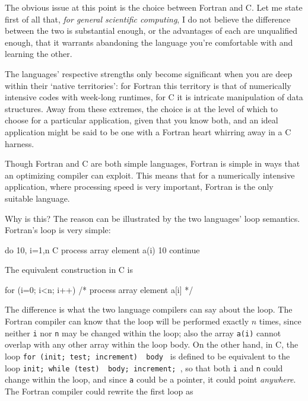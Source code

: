 \documentclass[11pt,oneside,chapters]{starlink}
\begin{document}
The obvious issue at this point is the choice between
Fortran and C.  Let me state first of all that, \emph{for
general scientific computing}, I do not believe the
difference between the two is substantial enough, or the
advantages of each are unqualified enough, that it warrants
abandoning the language you're comfortable with and learning
the other.

The languages' respective strengths only become significant
when you are deep within their `native territories': for
Fortran this territory is that of numerically intensive
codes with week-long runtimes, for C it is intricate
manipulation of data structures.  Away from these extremes,
the choice is at the level of which to choose for a
particular application, given that you know both, and an
ideal application might be said to be one with a Fortran
heart whirring away in a C harness.

Though Fortran and C are both simple languages, Fortran is
simple in ways that an optimizing compiler can exploit.
This means that for a numerically intensive application,
where processing speed is very important, Fortran is the
only suitable language.

Why is this?  The reason can be illustrated by the two
languages' loop semantics.  Fortran's loop is very simple:

\begin{terminalv}
   do 10, i=1,n
C  process array element a(i)
10 continue
\end{terminalv}

The equivalent construction in C is

\begin{terminalv}
    for (i=0; i<n; i++) {
       /* process array element a[i] */
    }
\end{terminalv}

The difference is what the two language compilers can say about the
loop. The Fortran compiler can know that the loop
will be performed exactly $n$
times, since neither \texttt{i} nor \texttt{n} may be changed within the loop; also the array \texttt{a(i)}
cannot overlap with any other array within the loop body.  On the
other hand, in C, the loop
\texttt{for (init; test; increment) { body }} is defined to be
equivalent to
the loop \texttt{init; while (test) {
body; increment; }}, so that both \texttt{i} and
\texttt{n} could change within the loop, and since \texttt{a}
could be a
pointer, it could point \emph{anywhere}.  The Fortran
compiler could
rewrite the first loop as
\end{document}
